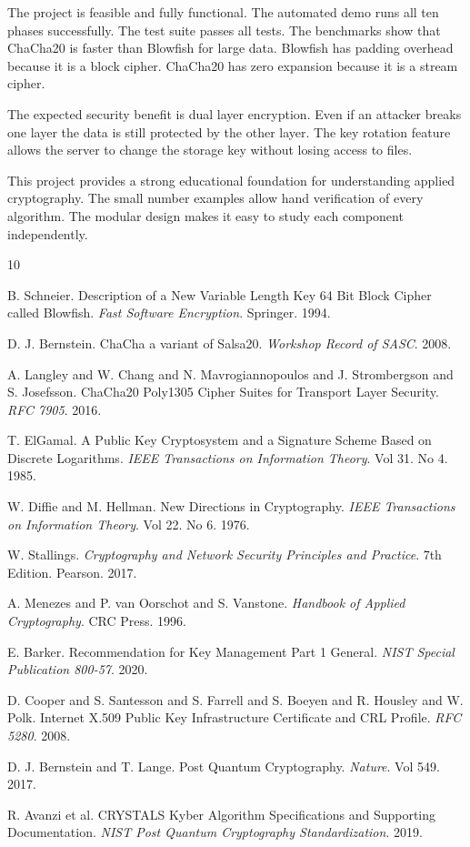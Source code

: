 \documentclass[12pt,a4paper]{article}
\begin{document}
The project is feasible and fully functional. The automated demo runs all ten phases successfully. The test suite passes all tests. The benchmarks show that ChaCha20 is faster than Blowfish for large data. Blowfish has padding overhead because it is a block cipher. ChaCha20 has zero expansion because it is a stream cipher.

The expected security benefit is dual layer encryption. Even if an attacker breaks one layer the data is still protected by the other layer. The key rotation feature allows the server to change the storage key without losing access to files.

This project provides a strong educational foundation for understanding applied cryptography. The small number examples allow hand verification of every algorithm. The modular design makes it easy to study each component independently.


\begin{thebibliography}{10}

B. Schneier. Description of a New Variable Length Key 64 Bit Block Cipher called Blowfish. \textit{Fast Software Encryption}. Springer. 1994.

D. J. Bernstein. ChaCha a variant of Salsa20. \textit{Workshop Record of SASC}. 2008.

A. Langley and W. Chang and N. Mavrogiannopoulos and J. Strombergson and S. Josefsson. ChaCha20 Poly1305 Cipher Suites for Transport Layer Security. \textit{RFC 7905}. 2016.

T. ElGamal. A Public Key Cryptosystem and a Signature Scheme Based on Discrete Logarithms. \textit{IEEE Transactions on Information Theory}. Vol 31. No 4. 1985.

W. Diffie and M. Hellman. New Directions in Cryptography. \textit{IEEE Transactions on Information Theory}. Vol 22. No 6. 1976.

W. Stallings. \textit{Cryptography and Network Security Principles and Practice}. 7th Edition. Pearson. 2017.

A. Menezes and P. van Oorschot and S. Vanstone. \textit{Handbook of Applied Cryptography}. CRC Press. 1996.

E. Barker. Recommendation for Key Management Part 1 General. \textit{NIST Special Publication 800-57}. 2020.

D. Cooper and S. Santesson and S. Farrell and S. Boeyen and R. Housley and W. Polk. Internet X.509 Public Key Infrastructure Certificate and CRL Profile. \textit{RFC 5280}. 2008.

D. J. Bernstein and T. Lange. Post Quantum Cryptography. \textit{Nature}. Vol 549. 2017.

R. Avanzi et al. CRYSTALS Kyber Algorithm Specifications and Supporting Documentation. \textit{NIST Post Quantum Cryptography Standardization}. 2019.

\end{thebibliography}
\end{document}

